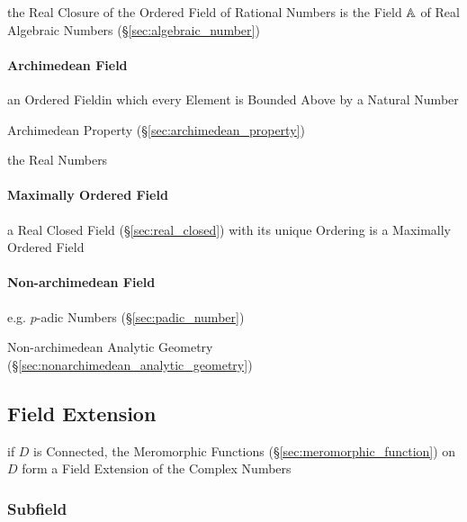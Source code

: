 the Real Closure of the Ordered Field of Rational Numbers is the Field $\mathbb{A}$
of Real Algebraic Numbers (\S\ref{sec:algebraic_number})



\paragraph{Archimedean Field}\label{sec:archimedean_field}\hfill

an Ordered Fieldin which every Element is Bounded Above by a Natural Number

Archimedean Property (\S\ref{sec:archimedean_property})

the Real Numbers



\paragraph{Maximally Ordered Field}\label{sec:maximally_ordered_field}\hfill

a Real Closed Field (\S\ref{sec:real_closed}) with its unique Ordering is a
Maximally Ordered Field



\paragraph{Non-archimedean Field}\label{sec:nonarchimedean_field}\hfill

e.g. $p$-adic Numbers (\S\ref{sec:padic_number})

\fist Non-archimedean Analytic Geometry
(\S\ref{sec:nonarchimedean_analytic_geometry})



\subsection{Field Extension}\label{sec:field_extension}

if $D$ is Connected, the Meromorphic Functions
(\S\ref{sec:meromorphic_function}) on $D$ form a Field Extension of the Complex
Numbers



\subsubsection{Subfield}\label{sec:subfield}

